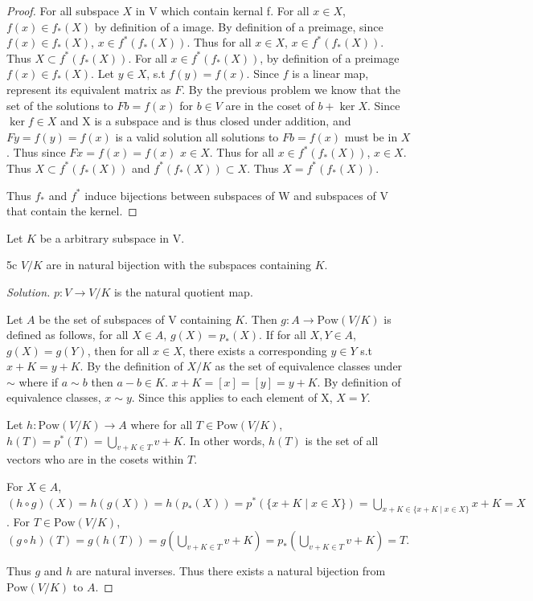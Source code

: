 \documentclass{article}
\newcommand{\rarr}[0]{\rightarrow}
\newcommand{\Pow}[1]{\text{Pow}(#1)}
\newenvironment{solution}
{\renewcommand\qedsymbol{$\blacksquare$}\begin{proof}[Solution]}
		{\end{proof}}
\begin{document}
\begin{proof}
	For all subspace $X$ in V which contain kernal f. For all $x \in X$, $f(x) \in f_*(X)$ by definition of a image. By definition of a preimage, since $f(x) \in f_*(X)$, $x \in f^*(f_*(X))$. Thus for all $x \in X$, $x \in f^*(f_*(X))$. Thus $X \subset f^*(f_*(X))$. For all $x \in f^*(f_*(X))$, by definition of a preimage $f(x) \in f_*(X)$. Let $y \in X$, s.t $f(y) = f(x)$. Since $f$ is a linear map, represent its equivalent matrix as $F$. By the previous problem we know that the set of the solutions to $Fb = f(x)$ for $b \in V$ are in the coset of $b + \ker{X}$. Since $\ker f \in X$ and X is a subspace and is thus closed under addition, and $Fy = f(y) = f(x)$ is a valid solution all solutions to $Fb = f(x)$ must be in $X$. Thus since $Fx =f(x) =f(x)$ $x \in X$. Thus for all $x \in f^*(f_*(X))$, $x \in X$. Thus $X \subset f^*(f_*(X))$ and $f^*(f_*(X)) \subset X$. Thus $X = f^*(f_*(X))$.

	Thus $f_*$ and $f^*$ induce bijections between subspaces of W and subspaces of V that contain the kernel.
\end{proof}

Let $K$ be a arbitrary subspace in V. 

\begin{claim}{5c}
	$V/K$ are in natural bijection with the subspaces containing $K$.
\end{claim}
\begin{solution}

	$p: V \rarr V/K$ is the natural quotient map.

	Let $A$ be the set of subspaces of V containing $K$. Then $g: A \rarr \Pow{V/K}$ is defined as follows, for all $X \in A$, $g(X) = p_*(X)$. If for all $X, Y \in A$, $g(X) = g(Y)$, then for all $x \in X$, there exists a corresponding $y \in Y$ s.t $x 
	+ K = y + K$. By the definition of $X/K$ as the set of equivalence classes under $\sim$ where if $a \sim b$ then $a - b \in K$. $x + K = [x] = [y] = y + K$. By definition of equivalence classes, $x \sim y$. Since this applies to each element of X, $X = Y$.

	Let $h: \Pow{V/K} \rarr A$ where for all $T \in \Pow{V/K}$,	$h(T) = p^*(T)= \bigcup_{v + K \in T} v + K$. In other words, $h(T)$ is the set of all vectors who are in the cosets within $T$. 

	For $X \in A$, $(h \circ g)(X) = h(g(X)) = h(p_*(X)) = p^*(\{ x + K \mid x \in X \}) = \bigcup_{x + K \in \{ x + K \mid x \in X \}} x + K = X$.
	For $T \in \Pow{V/K}$, $(g \circ h)(T) = g(h(T)) = g(\bigcup_{v + K \in T} v + K) = p_*(\bigcup_{v + K \in T} v + K) = T$.

	Thus $g$ and $h$ are natural inverses. Thus there exists a natural bijection from $\Pow{V/K} \text{ to }A$.

\end{solution}
\end{document}
